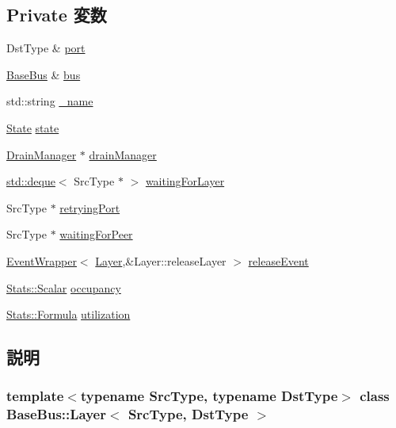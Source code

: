 \subsection*{Private 変数}
\begin{DoxyCompactItemize}
\item 
DstType \& \hyperlink{classBaseBus_1_1Layer_afb40502d9466732dadd57056e653d8f9}{port}
\item 
\hyperlink{classBaseBus}{BaseBus} \& \hyperlink{classBaseBus_1_1Layer_ad7d5bc8ce3d9e2ce16633178b4feb387}{bus}
\item 
std::string \hyperlink{classBaseBus_1_1Layer_aaf2ed934b37cbbd236fdd1b01a5f5005}{\_\-name}
\item 
\hyperlink{classBaseBus_1_1Layer_a5d74787dedbc4e11c1ab15bf487e61f8}{State} \hyperlink{classBaseBus_1_1Layer_a876b486d3a5241a126bd5751c5f70f79}{state}
\item 
\hyperlink{classDrainManager}{DrainManager} $\ast$ \hyperlink{classBaseBus_1_1Layer_a329b71fb934a93312ca0aacbf5a3f982}{drainManager}
\item 
\hyperlink{classstd_1_1deque}{std::deque}$<$ SrcType $\ast$ $>$ \hyperlink{classBaseBus_1_1Layer_a8db23e62d084ba779ff42aacec39065d}{waitingForLayer}
\item 
SrcType $\ast$ \hyperlink{classBaseBus_1_1Layer_a982a229cbb75d7774cb62aebcec3ee9f}{retryingPort}
\item 
SrcType $\ast$ \hyperlink{classBaseBus_1_1Layer_ab8ea7bd13cb34352f935d08c989ab5e8}{waitingForPeer}
\item 
\hyperlink{classEventWrapper}{EventWrapper}$<$ \hyperlink{classBaseBus_1_1Layer}{Layer},\&Layer::releaseLayer $>$ \hyperlink{classBaseBus_1_1Layer_a69eab40ac3f909ccc29d20e8dbdc022e}{releaseEvent}
\item 
\hyperlink{classStats_1_1Scalar}{Stats::Scalar} \hyperlink{classBaseBus_1_1Layer_a4bdb9e419f12a845feff7f1c7923a75f}{occupancy}
\item 
\hyperlink{classStats_1_1Formula}{Stats::Formula} \hyperlink{classBaseBus_1_1Layer_a04353589e0e920909d3ceb8e73abb7ac}{utilization}
\end{DoxyCompactItemize}


\subsection{説明}
\subsubsection*{template$<$typename SrcType, typename DstType$>$ class BaseBus::Layer$<$ SrcType, DstType $>$}

